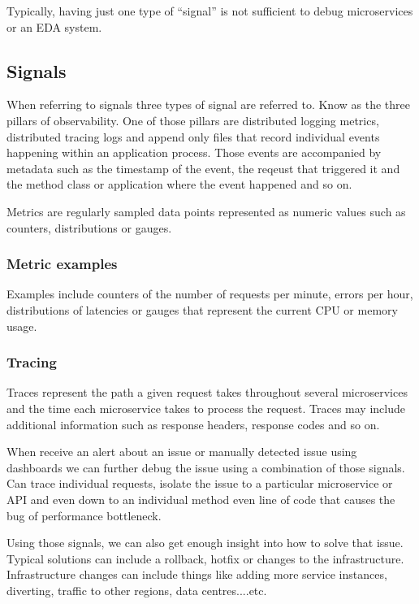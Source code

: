 \documentclass[a4paper, 11pt]{book}
\begin{document}
    Typically, having just one type of ``signal'' is not sufficient to debug microservices or an EDA system.

    \subsection{Signals}
    When referring to signals three types of signal are referred to.
    Know as the three pillars of observability.
    One of those pillars are distributed logging metrics, distributed tracing logs and append only files that record individual events happening within an application process.
    Those events are accompanied by metadata such as the timestamp of the event, the reqeust that triggered it and the method class or application where the event happened and so on.

    Metrics are regularly sampled data points represented as numeric values such as counters, distributions or gauges.

    \subsubsection{Metric examples}
    Examples include counters of the number of requests per minute, errors per hour, distributions of latencies or gauges that represent the current CPU or memory usage.

    \subsubsection{Tracing}
    Traces represent the path a given request takes throughout several microservices and the time each microservice takes to process the request.
    Traces may include additional information such as response headers, response codes and so on.

    When receive an alert about an issue or manually detected issue using dashboards we can further debug the issue using a combination of those signals.
    Can trace individual requests, isolate the issue to a particular microservice or API and even down to an individual method even line of code that causes the bug of performance bottleneck.

    Using those signals, we can also get enough insight into how to solve that issue.
    Typical solutions can include a rollback, hotfix or changes to the infrastructure.
    Infrastructure changes can include things like adding more service instances, diverting, traffic to other regions, data centres....etc.
\end{document}
